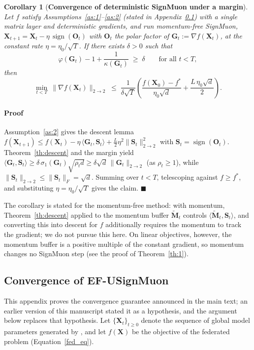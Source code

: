 \documentclass{article}
\newtheorem{corollary}[theorem]{Corollary}
\begin{document}
\begin{corollary}[\textbf{Convergence of deterministic SignMuon under a margin}]\label{cor:descent_conv}
Let $f$ satisfy Assumptions~\ref{as:1}--\ref{as:2} (stated in Appendix~\ref{app:hyp}) with a single matrix layer and deterministic gradients, and run momentum-free SignMuon, $\mathbf{X}_{t+1} = \mathbf{X}_t - \eta\,\operatorname{sign}(\mathbf{O}_t)$ with $\mathbf{O}_t$ the polar factor of $\mathbf{G}_t := \nabla f(\mathbf{X}_t)$, at the constant rate $\eta = \eta_0/\sqrt{T}$. If there exists $\delta > 0$ such that
\begin{equation}
\varphi(\mathbf{G}_t) - 1 + \frac{1}{\kappa(\mathbf{G}_t)} \;\ge\; \delta \qquad \text{for all } t < T,
\end{equation}
then
\begin{equation}
\min_{t < T}\ \|\nabla f(\mathbf{X}_t)\|_{2\to2} \;\le\; \frac{1}{\delta\sqrt{T}}\left(\frac{f(\mathbf{X}_0) - f^*}{\eta_0\sqrt{d}} + \frac{L\,\eta_0\sqrt{d}}{2}\right).
\end{equation}
\end{corollary}
\paragraph{Proof} Assumption~\ref{as:2} gives the descent lemma $f(\mathbf{X}_{t+1}) \le f(\mathbf{X}_t) - \eta\,\langle \mathbf{G}_t, \mathbf{S}_t\rangle + \tfrac{L}{2}\eta^2\|\mathbf{S}_t\|_{2\to2}^2$ with $\mathbf{S}_t = \operatorname{sign}(\mathbf{O}_t)$. Theorem~\ref{th:descent} and the margin yield $\langle \mathbf{G}_t, \mathbf{S}_t\rangle \ge \delta\,\sigma_1(\mathbf{G}_t)\sqrt{\rho_t d} \ge \delta\sqrt{d}\,\|\mathbf{G}_t\|_{2\to2}$ (as $\rho_t \ge 1$), while $\|\mathbf{S}_t\|_{2\to2} \le \|\mathbf{S}_t\|_F = \sqrt{d}$. Summing over $t < T$, telescoping against $f \ge f^*$, and substituting $\eta = \eta_0/\sqrt{T}$ gives the claim. $\blacksquare$

The corollary is stated for the momentum-free method: with momentum, Theorem~\ref{th:descent} applied to the momentum buffer $\tilde{\mathbf{M}}_t$ controls $\langle \tilde{\mathbf{M}}_t, \mathbf{S}_t\rangle$, and converting this into descent for $f$ additionally requires the momentum to track the gradient; we do not pursue this here. On linear objectives, however, the momentum buffer is a positive multiple of the constant gradient, so momentum changes no SignMuon step (see the proof of Theorem~\ref{th:1}).

\newpage
\subsection{Convergence of EF-USignMuon}\label{app:hyp}
This appendix proves the convergence guarantee announced in the main text; an earlier version of this manuscript stated it as a hypothesis, and the argument below replaces that hypothesis. Let $\{\mathbf{X}_t\}_{t\ge 0}$ denote the sequence of global model parameters generated by , and let $f(\mathbf{X})$ be the objective of the federated problem (Equation~\ref{fed_eq}).
\end{document}
